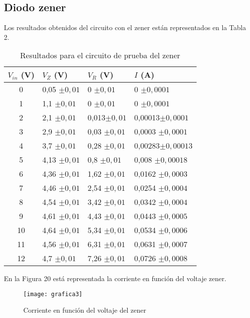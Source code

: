 \documentclass[a4paper,12pt,spanish]{article}
\begin{document}
\subsection{Diodo zener}

Los resultados obtenidos del circuito con el zener están representados en la Tabla 2.

\begin{table}[H]
	\centering
	\begin{tabular}{|c|l|l|l|}
		\hline
		$V_{in}$ (V) & $V_Z$ (V) & $V_R$ (V)  & $I$ (A)   \\ \hline
		0   & 0,05 $\pm 0,01$   & 0     $\pm 0,01$ & 0   $\pm 0,0001  $    \\ \hline
		1   & 1,1  $\pm 0,01$    & 0    $\pm 0,01$ & 0      $\pm 0,0001  $ \\ \hline
		2   & 2,1  $\pm 0,01$    & 0,013$\pm 0,01$ & 0,00013$\pm 0,0001  $ \\ \hline
		3   & 2,9  $\pm 0,01$    & 0,03 $\pm 0,01$ & 0,0003 $\pm 0,0001  $ \\ \hline
		4   & 3,7  $\pm 0,01$    & 0,28 $\pm 0,01$ & 0,00283$\pm 0,00013  $ \\ \hline
		5   & 4,13 $\pm 0,01$    & 0,8  $\pm 0,01$ & 0,008  $\pm 0,00018  $ \\ \hline
		6   & 4,36 $\pm 0,01$    & 1,62 $\pm 0,01$ & 0,0162 $\pm 0,0003  $ \\ \hline
		7   & 4,46 $\pm 0,01$    & 2,54 $\pm 0,01$ & 0,0254 $\pm 0,0004  $ \\ \hline
		8   & 4,54 $\pm 0,01$    & 3,42 $\pm 0,01$ & 0,0342 $\pm 0,0004  $ \\ \hline
		9   & 4,61 $\pm 0,01$    & 4,43 $\pm 0,01$ & 0,0443 $\pm 0,0005  $ \\ \hline
		10  & 4,64 $\pm 0,01$    & 5,34 $\pm 0,01$ & 0,0534 $\pm 0,0006  $ \\ \hline
		11  & 4,56 $\pm 0,01$    & 6,31 $\pm 0,01$ & 0,0631 $\pm 0,0007  $ \\ \hline
		12  & 4,7  $\pm 0,01$    & 7,26 $\pm 0,01$ & 0,0726 $\pm 0,0008  $ \\ \hline
	\end{tabular}
	\caption{Resultados para el circuito de prueba del zener}
	\label{tab:my-table}
\end{table}



En la Figura 20 está representada la corriente en función del voltaje zener.

\begin{figure}[H]
	\centering
	\texttt{[image: grafica3]}
	\caption{Corriente en función del voltaje del zener}
	\label{fig:grafica3}
\end{figure}
\end{document}
